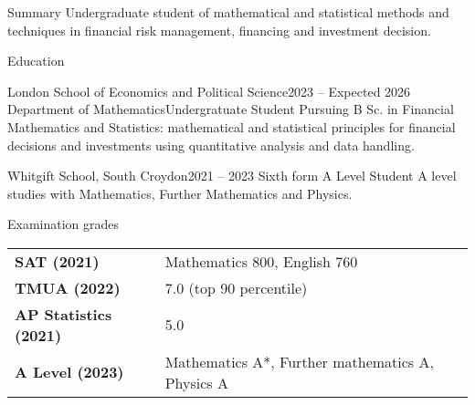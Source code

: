 \documentclass{resume} %
\begin{document}



\begin{rSection}{Summary}
Undergraduate student of mathematical and statistical methods and techniques in financial risk 
management, financing and investment decision. 
\end{rSection}


\begin{rSection}{Education}

  \begin{rSubsection}{London School of Economics and Political Science}{2023 -- Expected 2026}
            {Department of Mathematics}{Undergratuate Student}
      {Pursuing B Sc. in Financial Mathematics and Statistics: mathematical and statistical principles for financial decisions and investments using quantitative analysis and data handling.}
  \end{rSubsection}
  
 \begin{rSubsection}{Whitgift School, South Croydon}{2021 -- 2023}
            {Sixth form }{A Level Student}
            {A level studies with Mathematics, Further Mathematics and Physics. }
            
  \end{rSubsection}
    
\end{rSection}


\begin{rSection}{Examination grades}
\begin{tabular}{ @{} >{\bfseries}p{20em}  l }
SAT (2021) & Mathematics 800, English 760 \\
TMUA (2022) & 7.0 (top 90 percentile) \\
AP Statistics (2021) & 5.0 \\
A Level (2023) & Mathematics A*, Further mathematics A, Physics A 
\end{tabular}
\end{rSection}
\end{document}
